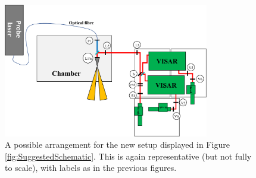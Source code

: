 \begin{figure}
\begin{centering}
\includegraphics[width=0.8\textwidth]{figures/Experiment/ImprovedSetup.pdf}%
\caption{\label{fig:SuggestedSetup} A possible arrangement for the new setup displayed in Figure \ref{fig:SuggestedSchematic}. This is again representative (but not fully to scale), with labels as in the previous figures.}
\end{centering}
\end{figure}